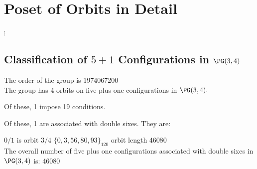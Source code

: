\section*{Poset of Orbits in Detail}
$\vdots$\\
\subsection*{Classification of $5+1$ Configurations in $\PG(3,4)$}
The order of the group is 1974067200\\
\bigskip
The group has 4 orbits on five plus one configurations in $\PG(3,4).$

Of these, 1 impose 19 conditions.

Of these, 1 are associated with double sixes. They are:

$0 / 1$ is orbit $3 / 4$ $
\{ 0, 3, 56, 80, 93 \}_{120}$ orbit length $46080$\\
The overall number of five plus one configurations associated with double sixes in $\PG(3,4)$ is: 46080\\
